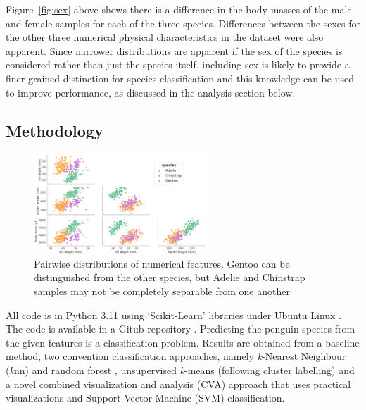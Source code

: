 \documentclass[12pt]{article}
\begin{document}
Figure~\ref{fig:sex} above shows there is a difference in the body masses of the male and female samples for each of the three species. 
Differences between the sexes for the other three numerical physical characteristics in the dataset were also apparent. 
Since narrower distributions are apparent if the sex of the species is considered rather than just the species itself, 
including sex is likely to provide a finer grained distinction for species classification 
and this knowledge can be used to improve performance, as discussed in the analysis section below. 

\subsection*{Methodology}

\begin{figure} %
  \centering
  \vspace{-3\baselineskip} %
  \includegraphics[width=0.58\textwidth]{pairwise.png} %
  \vspace{-0.5\baselineskip} %
  \caption{Pairwise distributions of numerical features. Gentoo can be distinguished from the other species, 
  but Adelie and Chinstrap samples may not be completely separable from one another}
  \vspace{-0.5\baselineskip} %
  \label{fig:pairwise}
\end{figure}

All code is in Python 3.11 \cite{python311} using ‘Scikit-Learn’ libraries \cite{scikit-learn} 
under Ubuntu Linux \cite{ubuntu}. The code is available in a Gitub repository \cite{TimAIRepo}. 
Predicting the penguin species from the given features is a classification problem. 
Results are obtained from a baseline method, two convention classification approaches, 
namely \textit{k}-Nearest Neighbour (\textit{k}nn) \cite{bishop2006pattern} and random forest \cite{breiman2001random}, 
unsupervised \textit{k}-means (following cluster labelling) \cite{tan2005introduction} 
and a novel combined visualization and analysis (CVA) approach that uses 
practical visualizations and Support Vector Machine (SVM) classification.
\end{document}
